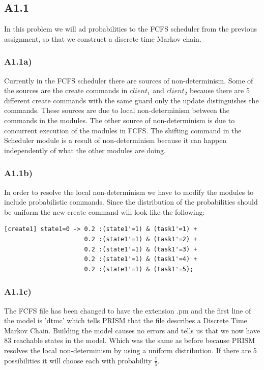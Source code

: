 \documentclass[12pt]{report}
\begin{document}
\subsection*{A1.1}
In this problem we will ad probabilities to the FCFS scheduler from the previous assignment, so that we construct a discrete time Markov chain.

\subsubsection*{A1.1a)}
Currently in the FCFS scheduler there are sources of non-determinism. Some of the sources are the create commands in $client_1$ and $client_2$ because there are 5 different create commands with the same guard only the update distinguishes the commands. These sources are due to local non-determinism between the commands in the modules. The other source of non-determinism is due to concurrent execution of the modules in FCFS. The shifting command in the Scheduler module is a result of non-determinism because it can happen independently of what the other modules are doing.

\subsubsection*{A1.1b)}
In order to resolve the local non-determinism we have to modify the modules to include probabilistic commands. Since the distribution of the probabilities should be uniform the new create command will look like the following:
\begin{lstlisting}[style=prismmodel]
[create1] state1=0 -> 0.2 :(state1'=1) & (task1'=1) +
                      0.2 :(state1'=1) & (task1'=2) +
                      0.2 :(state1'=1) & (task1'=3) +
                      0.2 :(state1'=1) & (task1'=4) + 
                      0.2 :(state1'=1) & (task1'=5);
\end{lstlisting}

\subsubsection*{A1.1c)}
The FCFS file has been changed to have the extension .pm and the first line of the model is 'dtmc' which tells PRISM that the file describes a Discrete Time Markov Chain. Building the model causes no errors and tells us that we now have 83 reachable states in the model. Which was the same as before because PRISM resolves the local non-determinism by using a uniform distribution. If there are 5 possibilities it will choose each with probability $\frac{1}{5}$.
\end{document}
